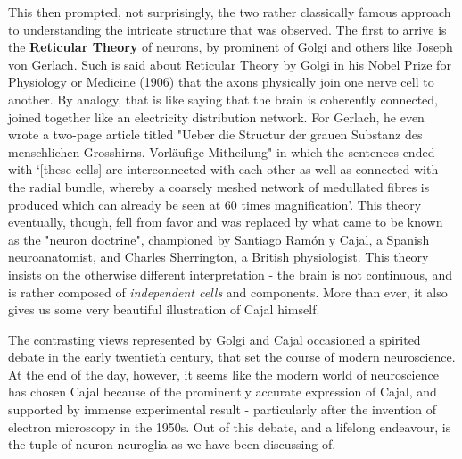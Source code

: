 This then prompted, not surprisingly, the two rather classically famous approach to understanding the intricate structure that was observed. The first to arrive is the \textbf{Reticular Theory} of neurons, by prominent of Golgi and others like Joseph von Gerlach. Such is said about Reticular Theory by Golgi in his Nobel Prize for Physiology or Medicine (1906) that the axons physically join one nerve cell to another. By analogy, that is like saying that the brain is coherently connected, joined together like an electricity distribution network. For Gerlach, he even wrote a two-page article titled "Ueber die Structur der grauen Substanz des menschlichen Grosshirns. Vorläufige Mitheilung" \cite{gerlach1872struktur} in which the sentences ended with `[these cells] are interconnected with each other as well as connected with the radial bundle, whereby a coarsely meshed network of medullated fibres is produced which can already be seen at 60 times magnification'. This theory eventually, though, fell from favor and was replaced by what came to be known as the "neuron doctrine", championed by Santiago Ramón y Cajal, a Spanish neuroanatomist, and Charles Sherrington, a British physiologist. This theory insists on the otherwise different interpretation - the brain is not continuous, and is rather composed of \textit{independent cells} and components.  More than ever, it also gives us some very beautiful illustration of Cajal himself. 

The contrasting views represented by Golgi and Cajal occasioned a spirited debate in the early twentieth century, that set the course of modern neuroscience. At the end of the day, however, it seems like the modern world of neuroscience has chosen Cajal because of the prominently accurate expression of Cajal, and supported by immense experimental result - particularly after the invention of electron microscopy in the 1950s. Out of this debate, and a lifelong endeavour, is the tuple of neuron-neuroglia as we have been discussing of. 

